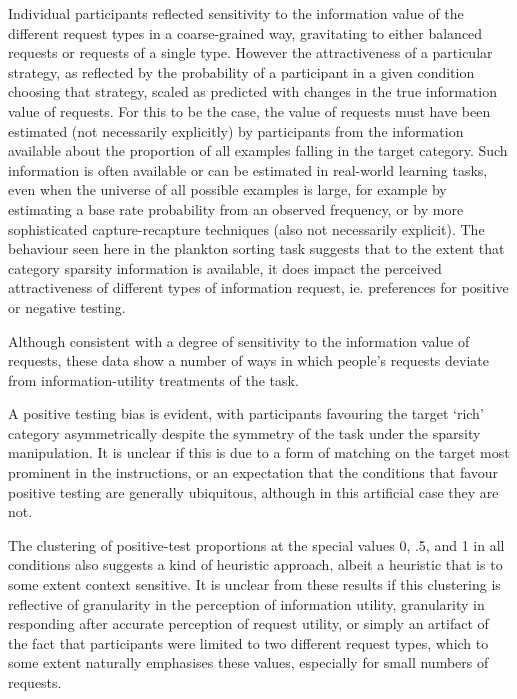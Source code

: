 \documentclass[10pt,letterpaper]{article}
\begin{document}
Individual participants reflected sensitivity to the information value of the different request types in a coarse-grained way, gravitating to either balanced requests or requests of a single type. However the attractiveness of a particular strategy, as reflected by the probability of a participant in a given condition choosing that strategy, scaled as predicted with changes in the true information value of requests. For this to be the case, the value of requests must have been estimated (not necessarily explicitly) by participants from the information available about the proportion of all examples falling in the target category. Such information is often available or can be estimated in real-world learning tasks, even when the universe of all possible examples is large, for example by estimating a base rate probability from an observed frequency, or by more sophisticated capture-recapture techniques (also not necessarily explicit).%
The behaviour seen here in the plankton sorting task suggests that to the extent that category sparsity information is available, it does impact the perceived attractiveness of different types of information request, ie. preferences for positive or negative testing.

Although consistent with a degree of sensitivity to the information value of requests, these data show a number of ways in which people's requests deviate from information-utility treatments of the task. 

A positive testing bias is evident, with participants favouring the target `rich' category asymmetrically despite the symmetry of the task under the sparsity manipulation. It is unclear if this is due to a form of matching \cite{evans1998matching} on the target most prominent in the instructions, or an expectation that the conditions that favour positive testing are generally ubiquitous, although in this artificial case they are not.

The clustering of positive-test proportions at the special values 0, .5, and 1 in all conditions also suggests a kind of heuristic approach, albeit a heuristic that is to some extent context sensitive. It is unclear from these results if this clustering is reflective of granularity in the perception of information utility, granularity in responding after accurate perception of request utility, or simply an artifact of the fact that participants were limited to two different request types, which to some extent naturally emphasises these values, especially for small numbers of requests.
\end{document}
